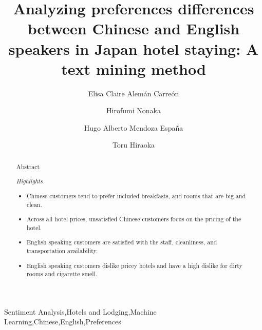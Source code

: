 \documentclass[review]{elsarticle}
\begin{document}
\begin{frontmatter}

\title{Analyzing preferences differences between Chinese and English speakers in Japan hotel staying: A text mining method}

\author[gidai]{Elisa Claire Alemán Carreón
}

\author[gidai]{Hirofumi Nonaka}

\author[gidai]{Hugo Alberto Mendoza Espa\~na}

\author[nagasaki]{Toru Hiraoka}

\address[gidai]{Nagaoka University of Technology, Nagaoka, Japan}
\address[nagasaki]{University of Nagasaki, Nagasaki, Japan}


\begin{abstract}
Abstract











\medskip
\noindent\it{Highlights}
\begin{itemize}
    \item Chinese customers tend to prefer included breakfasts, and rooms that are big and clean.
    \item Across all hotel prices, unsatisfied Chinese customers focus on the pricing of the hotel.
    \item English speaking customers are satisfied with the staff, cleanliness, and transportation availability.
    \item English speaking customers dislike pricey hotels and have a high dislike for dirty rooms and cigarette smell.
\end{itemize}

\end{abstract}

\begin{keyword}
Sentiment Analysis\sep Hotels and Lodging\sep Machine Learning\sep Chinese\sep English\sep Preferences
\end{keyword}

\end{frontmatter}
\end{document}
